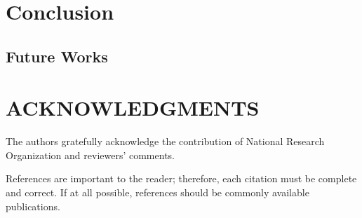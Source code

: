\documentclass[english]{article}
\newcommand{\projectbibfile}{}
\newcommand{\projectstructuralbibfile}{}
\renewcommand{\projectbibfile}{tools/refers}%
\renewcommand{\projectstructuralbibfile}{tools/dca_structural_complexity_refs}%
\renewcommand{\projectbibfile}{../tools/refers}%
\renewcommand{\projectstructuralbibfile}{../tools/dca_structural_complexity_refs}%
\begin{document}

\section{Conclusion}

\subsection{Future Works}


\appendix



\section{ACKNOWLEDGMENTS}

The authors gratefully acknowledge the contribution of National Research Organization and reviewers' comments.



References are important to the reader; therefore, each citation must be complete and correct. If at all possible, references should be commonly available publications.



\end{document}
